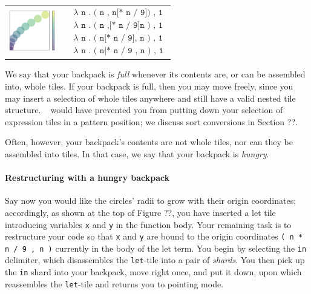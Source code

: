 \noindent
\begin{tabular}{cp{7cm}}
\includegraphics[width=2cm]{img/circles-parabola-transpose.png}
&
{
\begin{align*}
  & \texttt{$\lambda$ n . ( n , n[* n / 9]) , 1} \\
  & \texttt{$\lambda$ n . ( n ,[* n / 9]n ) , 1} \\
  & \texttt{$\lambda$ n . ( n[* n / 9], n ) , 1} \\
  & \texttt{$\lambda$ n . ( n|* n / 9 , n ) , 1}
\end{align*}
}
\end{tabular}


We say that your backpack is \emph{full} whenever
its contents are, or can be assembled into, whole tiles.
If your backpack is full, then you may move freely,
since you may insert a selection of whole tiles anywhere and
still have a valid nested tile structure.
\tylr~ would have prevented you from putting
down your selection of expression tiles in a pattern
position; we discuss sort conversions in Section ??.


Often, however, your backpack's contents are not whole
tiles, nor can they be assembled into tiles.
In that case, we say that your backpack is \emph{hungry}.

\paragraph{Restructuring with a hungry backpack}


Say now you would like the circles' radii to grow
with their origin coordinates; accordingly,
as shown at the top of Figure ??,
you have inserted
a let tile introducing variables \texttt{x} and \texttt{y}
in the function body.
Your remaining task is to restructure your code so that \texttt{x}
and \texttt{y} are bound to the origin coordinates
\texttt{( n * n / 9 , n )} currently in the body of the let term.
You begin by selecting the \texttt{in} delimiter,
which disassembles the \texttt{let}-tile into a pair of \emph{shards}.
You then pick up the \texttt{in} shard into your backpack,
move right once, and put it down,
upon which \tylr~ reassembles the \texttt{let}-tile
and returns you to pointing mode.

